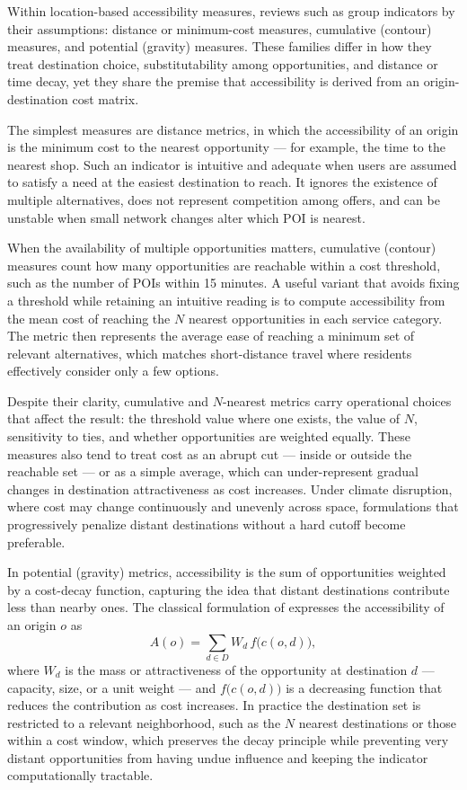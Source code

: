 Within location-based accessibility measures, reviews such as \cite{Geurs2004} group indicators by their assumptions: distance or minimum-cost measures, cumulative (contour) measures, and potential (gravity) measures. These families differ in how they treat destination choice, substitutability among opportunities, and distance or time decay, yet they share the premise that accessibility is derived from an origin-destination cost matrix.

The simplest measures are distance metrics, in which the accessibility of an origin is the minimum cost to the nearest opportunity — for example, the time to the nearest shop. Such an indicator is intuitive and adequate when users are assumed to satisfy a need at the easiest destination to reach. It ignores the existence of multiple alternatives, does not represent competition among offers, and can be unstable when small network changes alter which POI is nearest.

When the availability of multiple opportunities matters, cumulative (contour) measures count how many opportunities are reachable within a cost threshold, such as the number of POIs within 15 minutes. A useful variant that avoids fixing a threshold while retaining an intuitive reading is to compute accessibility from the mean cost of reaching the $N$ nearest opportunities in each service category. The metric then represents the average ease of reaching a minimum set of relevant alternatives, which matches short-distance travel where residents effectively consider only a few options.

Despite their clarity, cumulative and $N$-nearest metrics carry operational choices that affect the result: the threshold value where one exists, the value of $N$, sensitivity to ties, and whether opportunities are weighted equally. These measures also tend to treat cost as an abrupt cut — inside or outside the reachable set — or as a simple average, which can under-represent gradual changes in destination attractiveness as cost increases. Under climate disruption, where cost may change continuously and unevenly across space, formulations that progressively penalize distant destinations without a hard cutoff become preferable.

In potential (gravity) metrics, accessibility is the sum of opportunities weighted by a cost-decay function, capturing the idea that distant destinations contribute less than nearby ones. The classical formulation of \cite{Hansen1959} expresses the accessibility of an origin $o$ as
\begin{equation}
A(o) = \sum_{d \in D} W_d \, f\!\big(c(o,d)\big),
\end{equation}
where $W_d$ is the mass or attractiveness of the opportunity at destination $d$ — capacity, size, or a unit weight — and $f\!\big(c(o,d)\big)$ is a decreasing function that reduces the contribution as cost increases. In practice the destination set is restricted to a relevant neighborhood, such as the $N$ nearest destinations or those within a cost window, which preserves the decay principle while preventing very distant opportunities from having undue influence and keeping the indicator computationally tractable.

